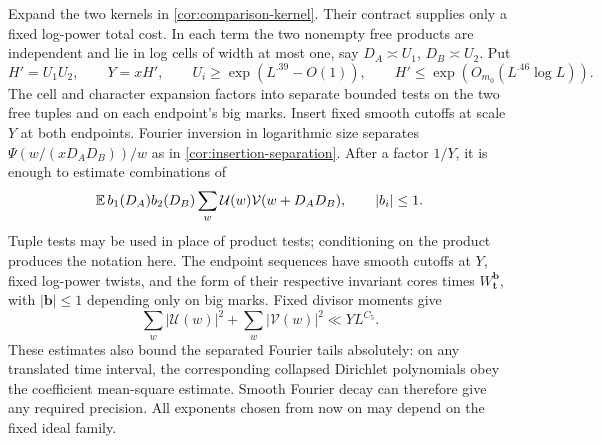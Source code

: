 Expand the two kernels in \eqref{cor:comparison-kernel}.  Their
contract supplies only a fixed log-power total cost.  In each term the
two nonempty free products are independent and lie in log cells of
width at most one, say $D_A\asymp U_1$, $D_B\asymp U_2$.  Put
\begin{equation}\label{cor:comparison-scales}
 H'=U_1U_2,\qquad Y=xH',\qquad
 U_i\geq\exp(L^{.39}-O(1)),\qquad
 H'\leq\exp(O_{m_0}(L^{.46}\log L)).
\end{equation}
The cell and character expansion factors into separate bounded tests
on the two free tuples and on each endpoint's big marks.  Insert fixed
smooth cutoffs at scale $Y$ at both endpoints.  Fourier inversion in
logarithmic size separates $\Psi(w/(xD_AD_B))/w$ as in
\eqref{cor:insertion-separation}.  After a factor $1/Y$, it is enough
to estimate combinations of
\begin{equation}\label{cor:comparison-sum}
 \mathbb E\,b_1(D_A)b_2(D_B)
       \sum_w\mathcal U(w)\mathcal V(w+D_AD_B),
 \qquad |b_i|\leq1.
\end{equation}
Tuple tests may be used in place of product tests; conditioning on the
product produces the notation here.  The endpoint sequences have
smooth cutoffs at $Y$, fixed log-power twists, and the form of their
respective invariant cores times $W_{\mathbf t}^{\mathbf b}$, with
$|\mathbf b|\leq1$ depending only on big marks.  Fixed divisor moments
give
\begin{equation}\label{cor:endpoint-squares}
 \sum_w|\mathcal U(w)|^2+\sum_w|\mathcal V(w)|^2
       \ll YL^{C_5}.
\end{equation}
These estimates also bound the separated Fourier tails absolutely:
on any translated time interval, the corresponding collapsed
Dirichlet polynomials obey the coefficient mean-square estimate.
Smooth Fourier decay can therefore give any required precision.
All exponents chosen from now on may depend on the fixed ideal family.

